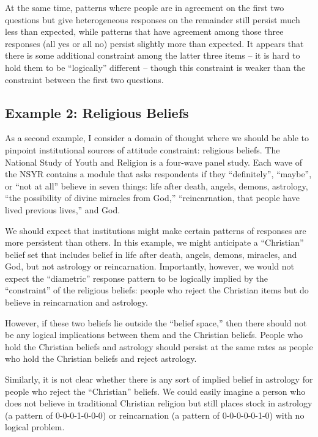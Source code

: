 \documentclass[12pt,]{article}
\begin{document}
At the same time, patterns where people are in agreement on the first two questions but give heterogeneous responses on the remainder still persist much less than expected, while patterns that have agreement among those three responses (all yes or all no) persist slightly more than expected. It appears that there is some additional constraint among the latter three items -- it is hard to hold them to be ``logically'' different -- though this constraint is weaker than the constraint between the first two questions.

\hypertarget{example-2-religious-beliefs}{%
\subsection{Example 2: Religious Beliefs}\label{example-2-religious-beliefs}}

As a second example, I consider a domain of thought where we should be able to pinpoint institutional sources of attitude constraint: religious beliefs. The National Study of Youth and Religion is a four-wave panel study. Each wave of the NSYR contains a module that asks respondents if they ``definitely'', ``maybe'', or ``not at all'' believe in seven things: life after death, angels, demons, astrology, ``the possibility of divine miracles from God,'' ``reincarnation, that people have lived previous lives,'' and God.

We should expect that institutions might make certain patterns of responses are more persistent than others. In this example, we might anticipate a ``Christian'' belief set that includes belief in life after death, angels, demons, miracles, and God, but not astrology or reincarnation. Importantly, however, we would not expect the ``diametric'' response pattern to be logically implied by the ``constraint'' of the religious beliefs: people who reject the Christian items but do believe in reincarnation and astrology.

However, if these two beliefs lie outside the ``belief space,'' then there should not be any logical implications between them and the Christian beliefs. People who hold the Christian beliefs and astrology should persist at the same rates as people who hold the Christian beliefs and reject astrology.

Similarly, it is not clear whether there is any sort of implied belief in astrology for people who reject the ``Christian'' beliefs. We could easily imagine a person who does not believe in traditional Christian religion but still places stock in astrology (a pattern of 0-0-0-1-0-0-0) or reincarnation (a pattern of 0-0-0-0-0-1-0) with no logical problem.
\end{document}
